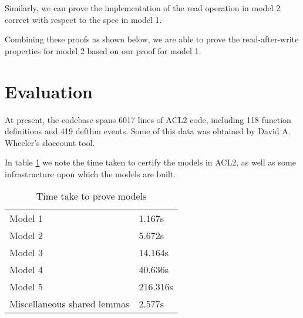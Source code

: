 \documentclass[format=sigconf,review=true]{acmart}
\begin{document}
Similarly, we can prove the implementation of the read operation in
model 2 correct with respect to the spec in model 1.


Combining these proofs as shown below, we are able to prove the read-after-write
properties for model 2 based on our proof for model 1.


\section{Evaluation}
At present, the codebase spans 6017 lines of ACL2 code, including 118
function definitions and 419 defthm events. Some of this data was
obtained by David A. Wheeler's sloccount tool.

In table \ref{certification-timing-table} we note the time taken to certify
the models in ACL2, as well as some infrastructure upon which the
models are built.

\begin{table}[]
  \centering
  \caption{Time take to prove models}
  \label{certification-timing-table}
  \begin{tabular}{ll}
    Model 1 & 1.167s \\
    Model 2 & 5.672s \\
    Model 3 & 14.164s \\
    Model 4 & 40.636s \\
    Model 5 & 216.316s \\
    Miscellaneous shared lemmas & 2.577s \\
  \end{tabular}
\end{table}
\end{document}
